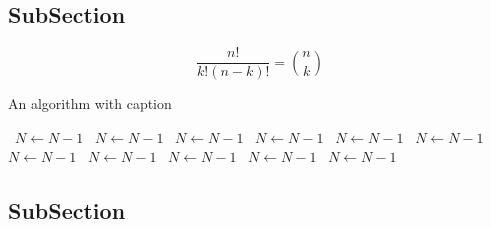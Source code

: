 \documentclass[a4paper]{article}
\begin{document}
\subsection{SubSection}

\[ \frac{n!}{k!(n-k)!} = \binom{n}{k} \]

\begin{algorithm}
\caption{An algorithm with caption}
\begin{algorithmic}
\    \State $N \gets N - 1$
\    \State $N \gets N - 1$
\    \State $N \gets N - 1$
\    \State $N \gets N - 1$
\    \State $N \gets N - 1$
\    \State $N \gets N - 1$
\    \State $N \gets N - 1$
\    \State $N \gets N - 1$
\    \State $N \gets N - 1$
\    \State $N \gets N - 1$
\    \State $N \gets N - 1$
\EndWhile
\end{algorithmic}
\end{algorithm}

\subsection{SubSection}
\end{document}
